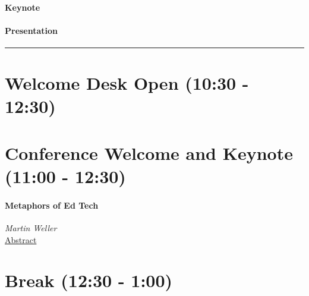 \documentclass[
]{book}
\begin{document}
\begin{reflect}
\hypertarget{keynote}{%
\paragraph{Keynote}\label{keynote}}
\end{reflect}

\begin{secondary}
\hypertarget{presentation}{%
\paragraph{Presentation}\label{presentation}}
\end{secondary}

\begin{center}\rule{0.5\linewidth}{0.5pt}\end{center}

\hypertarget{welcome-desk-open-1030---1230}{%
\section*{Welcome Desk Open (10:30 - 12:30)}\label{welcome-desk-open-1030---1230}}

\hypertarget{conference-welcome-and-keynote-1100---1230}{%
\section*{Conference Welcome and Keynote (11:00 - 12:30)}\label{conference-welcome-and-keynote-1100---1230}}

\begin{reflect}
\hypertarget{metaphors-of-ed-tech}{%
\paragraph{Metaphors of Ed Tech}\label{metaphors-of-ed-tech}}

\emph{Martin Weller}\\
\href{https://otessa.github.io/2022/keynotes-intro.html\#metaphors-of-edtech}{Abstract}
\end{reflect}

\hypertarget{break-1230---100}{%
\section*{Break (12:30 - 1:00)}\label{break-1230---100}}
\end{document}
